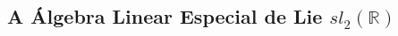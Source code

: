 \documentclass[twoside,openright,titlepage,numbers=noenddot,headinclude,  lineheaders footinclude=true,cleardoublepage=empty,
                                BCOR=5mm,paper=a4,fontsize=12pt ]{scrbook}
\newtheorem{teo}{Teorema}[chapter]
\theoremstyle{definition}
\DeclareMathOperator{\Tr}{Tr}
\DeclareMathOperator{\Adj}{Ad}
\begin{document}

\subsection{A \'Algebra Linear Especial de Lie $sl_2(\mathbb{R})$}
\end{document}
